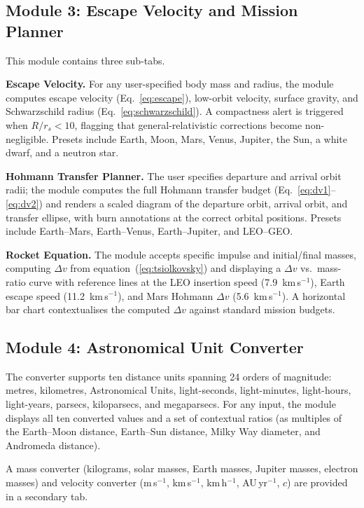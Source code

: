 \documentclass[10pt,a4paper]{article}
\begin{document}
\subsection{Module 3: Escape Velocity and Mission Planner}

This module contains three sub-tabs.

\textbf{Escape Velocity.}
For any user-specified body mass and radius, the module computes escape
velocity (Eq.~\ref{eq:escape}), low-orbit velocity, surface gravity, and
Schwarzschild radius (Eq.~\ref{eq:schwarzschild}).
A compactness alert is triggered when $R/r_s < 10$, flagging that
general-relativistic corrections become non-negligible.
Presets include Earth, Moon, Mars, Venus, Jupiter, the Sun, a white dwarf,
and a neutron star.

\textbf{Hohmann Transfer Planner.}
The user specifies departure and arrival orbit radii; the module computes
the full Hohmann transfer budget (Eq.~\ref{eq:dv1}--\ref{eq:dv2}) and renders
a scaled diagram of the departure orbit, arrival orbit, and transfer ellipse,
with burn annotations at the correct orbital positions.
Presets include Earth--Mars, Earth--Venus, Earth--Jupiter, and LEO--GEO.

\textbf{Rocket Equation.}
The module accepts specific impulse and initial/final masses, computing
$\Delta v$ from equation~(\ref{eq:tsiolkovsky}) and displaying a $\Delta v$
vs.\ mass-ratio curve with reference lines at the LEO insertion speed
(7.9~km\,s$^{-1}$), Earth escape speed (11.2~km\,s$^{-1}$), and Mars
Hohmann $\Delta v$ (5.6~km\,s$^{-1}$).
A horizontal bar chart contextualises the computed $\Delta v$ against standard
mission budgets.

\subsection{Module 4: Astronomical Unit Converter}

The converter supports ten distance units spanning 24 orders of magnitude:
metres, kilometres, Astronomical Units, light-seconds, light-minutes,
light-hours, light-years, parsecs, kiloparsecs, and megaparsecs.
For any input, the module displays all ten converted values and a set of
contextual ratios (as multiples of the Earth--Moon distance, Earth--Sun
distance, Milky Way diameter, and Andromeda distance).

A mass converter (kilograms, solar masses, Earth masses, Jupiter masses,
electron masses) and velocity converter (m\,s$^{-1}$, km\,s$^{-1}$,
km\,h$^{-1}$, AU\,yr$^{-1}$, $c$) are provided in a secondary tab.
\end{document}
